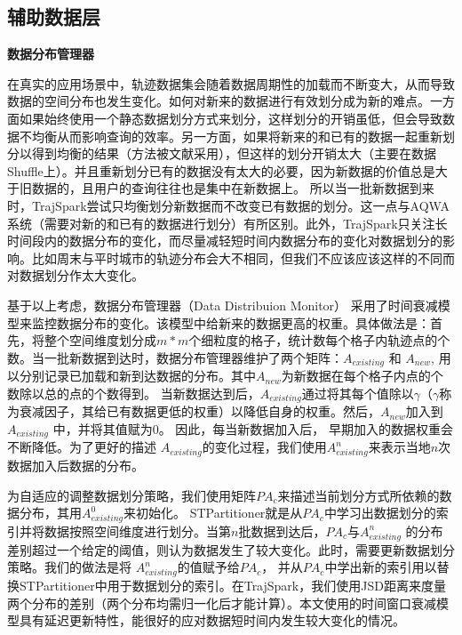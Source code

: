 \subsection{辅助数据层}

\textbf{数据分布管理器}

在真实的应用场景中，轨迹数据集会随着数据周期性的加载而不断变大\cite{AlyMHAOEQ15}，从而导致数据的空间分布也发生变化。如何对新来的数据进行有效划分成为新的难点。一方面如果始终使用一个静态数据划分方式来划分，这样划分的开销虽低，但会导致数据不均衡从而影响查询的效率。另一方面，如果将新来的和已有的数据一起重新划分以得到均衡的结果（方法被文献\cite{SpatialSpark,Locationspark,GeoSpark,Simba}采用），但这样的划分开销太大（主要在数据Shuffle上）。并且重新划分已有的数据没有太大的必要，因为新数据的价值总是大于旧数据的，且用户的查询往往也是集中在新数据上。
所以当一批新数据到来时，TrajSpark尝试只均衡划分新数据而不改变已有数据的划分。这一点与AQWA 系统\cite{AlyMHAOEQ15}（需要对新的和已有的数据进行划分）有所区别。此外，TrajSpark只关注长时间段内的数据分布的变化，而尽量减轻短时间内数据分布的变化对数据划分的影响。比如周末与平时城市的轨迹分布会大不相同，但我们不应该应该这样的不同而对数据划分作太大变化。

基于以上考虑，数据分布管理器（Data Distribuion Monitor） 采用了时间衰减模型来监控数据分布的变化。该模型中给新来的数据更高的权重。具体做法是：首先，将整个空间维度划分成$m*m$个细粒度的格子，统计数每个格子内轨迹点的个数。当一批新数据到达时，数据分布管理器维护了两个矩阵：$A_{existing}$ 和 $A_{new}$, 用以分别记录已加载和新到达数据的分布。其中$A_{new}$为新数据在每个格子内点的个数除以总的点的个数得到。
当新数据达到后，$A_{existing}$通过将其每个值除以$\gamma$（$\gamma$称为衰减因子，其给已有数据更低的权重）以降低自身的权重。然后，$A_{new}$加入到 $A_{existing}$ 中，并将其值赋为0。 因此，每当新数据加入后， 早期加入的数据权重会不断降低。为了更好的描述 $A_{existing}$的变化过程，我们使用$A_{existing}^{n}$来表示当地$n$次数据加入后数据的分布。

为自适应的调整数据划分策略，我们使用矩阵$PA_{c}$来描述当前划分方式所依赖的数据分布，其用$A_{existing}^{0}$来初始化。
STPartitioner就是从$PA_{c}$中学习出数据划分的索引并将数据按照空间维度进行划分。当第$n$批数据到达后，$PA_{c}$与$A_{existing}^{n}$ 的分布差别超过一个给定的阈值，则认为数据发生了较大变化。此时，需要更新数据划分策略。我们的做法是将 $A_{existing}^{n}$的值赋予给$PA_{c}$， 并从$PA_{c}$中学出新的索引用以替换STPartitioner中用于数据划分的索引。在TrajSpark，我们使用JSD距离来度量两个分布的差别（两个分布均需归一化后才能计算）。本文使用的时间窗口衰减模型具有延迟更新特性，能很好的应对数据短时间内发生较大变化的情况。

